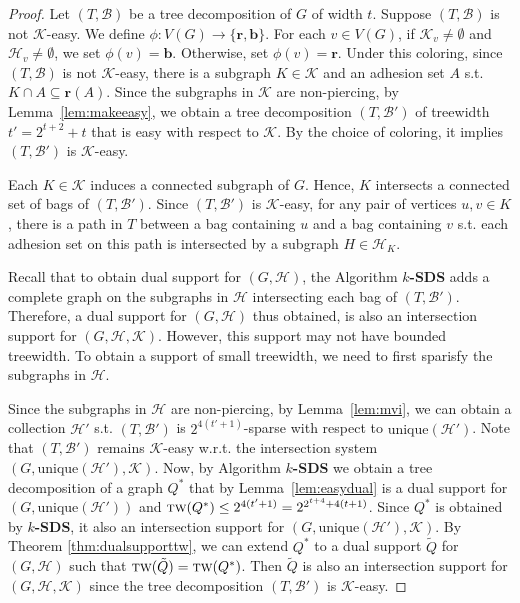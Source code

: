 \documentclass[12pt]{article}
\newcommand{\BB}{\mathcal{B}}
\newcommand{\R}{\mathbf{r}}
\newcommand{\B}{\mathbf{b}}
\newcommand{\HH}{\mathcal{H}}
\newcommand{\KK}{\mathcal{K}}
\newcommand{\tw}{\textsc{tw}}
\newcommand{\unique}{\textrm{unique}}
\theoremstyle{case}
\begin{document}
\intsupporttw*
\begin{proof}
Let $(T,\mathcal{B})$ be a tree decomposition of $G$ of 
width $t$. Suppose $(T,\mathcal{B})$ is not $\mathcal{K}$-easy.
We define $\phi:V(G)\to\{\R,\B\}$.
For each $v\in V(G)$,  
if $\mathcal{K}_v\neq\emptyset$ and $\mathcal{H}_v\neq\emptyset$,
we set $\phi(v)=\B$. Otherwise, set $\phi(v)=\R$.
Under this coloring, since $(T,\mathcal{B})$ is not $\mathcal{K}$-easy,
there is a subgraph $K\in\mathcal{K}$ and an adhesion set $A$ s.t.
$K\cap A\subseteq\R(A)$. 
Since the subgraphs in $\mathcal{K}$ are non-piercing, 
by Lemma~\ref{lem:makeeasy}, we obtain a
tree decomposition $(T,\mathcal{B}')$ of treewidth $t'=2^{t+2}+t$
that is easy with respect to $\mathcal{K}$.
By the choice of coloring, it implies
$(T,\mathcal{B}')$ is $\mathcal{K}$-easy.

Each $K\in\mathcal{K}$ induces a connected subgraph of $G$.
Hence, $K$ intersects a connected set of bags of 
$(T,\mathcal{B'})$. Since $(T,\mathcal{B}')$ is $\mathcal{K}$-easy,
for any pair of vertices $u,v\in K$, there is a path in $T$
between a bag containing $u$ and a bag containing $v$ s.t.
each adhesion set on this path is intersected by a subgraph
$H\in\mathcal{H}_K$. 

Recall that to obtain dual support for $(G,\HH)$, the Algorithm {\bf $k$-SDS} adds a complete graph on the subgraphs
in $\mathcal{H}$ intersecting each bag of $(T,\mathcal{B}')$.
Therefore, a dual support for $(G,\HH)$ thus obtained, is also an intersection support for $(G,\HH,\KK)$.
However, this support may not have bounded treewidth. 
To obtain a support of small treewidth, we need to first sparisfy the subgraphs in $\mathcal{H}$.

Since the subgraphs in $\mathcal{H}$ are non-piercing, by Lemma~\ref{lem:mvi}, we can obtain a collection $\mathcal{H}'$
s.t. $(T,\mathcal{B}')$ is $2^{4(t'+1)}$-sparse with respect to 
$\unique(\mathcal{H}')$.
Note that $(T,\mathcal{B}')$ remains $\KK$-easy w.r.t. the intersection system $(G,\unique(\HH'),\KK)$.
Now, by Algorithm {\bf $k$-SDS} we
obtain a tree decomposition of a graph $Q^*$ that by Lemma~\ref{lem:easydual} is a dual support for $(G,\unique(\HH'))$ and $\tw(Q^*)\le 2^{4(t'+1)}=2^{{2^{t+4}}+4(t+1)}$.
Since $Q^*$ is obtained by {\bf $k$-SDS}, it also an intersection support 
for $(G,\unique(\mathcal{H}'),\mathcal{K})$.
By Theorem \ref{thm:dualsupporttw}, we can extend $Q^*$ to a dual support $\tilde{Q}$ for $(G,\HH)$ such that $\tw(\tilde{Q})=\tw(Q^*)$.
Then $\tilde{Q}$ is also an intersection support for $(G,\HH,\KK)$ since the tree decomposition $(T,\BB')$ is $\KK$-easy.
\end{proof}
\end{document}
